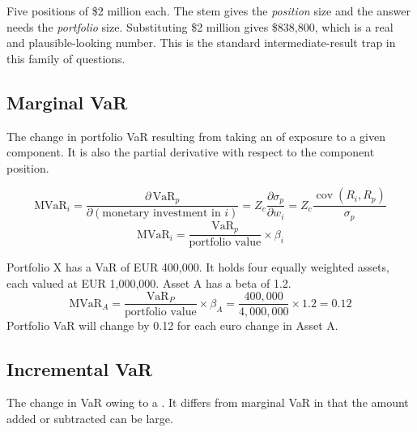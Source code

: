 \begin{imtrapbox}[breakable=false,title={The \$10 million is not given}]
Five positions of \$2 million each. The stem gives the \emph{position} size and
the answer needs the \emph{portfolio} size. Substituting \$2 million gives
\$838,800, which is a real and plausible-looking number. This is the standard
intermediate-result trap in this family of questions.
\end{imtrapbox}

\subsection{Marginal VaR}

\begin{imdefbox}[title={Marginal VaR}]
The change in portfolio VaR resulting from taking an  of
exposure to a given component. It is also the partial derivative with respect to
the component position.
\end{imdefbox}

\begin{imfmlbox}
\[ \text{MVaR}_i = \frac{\partial\,\text{VaR}_p}{\partial(\text{monetary investment in } i)}
  = Z_c\frac{\partial \sigma_p}{\partial w_i}
  = Z_c\frac{\operatorname{cov}(R_i,R_p)}{\sigma_p} \]
\vspace{-10pt}
\[ \text{MVaR}_i = \frac{\text{VaR}_p}{\text{portfolio value}} \times \beta_i \]
\end{imfmlbox}

\begin{imexbox}[title={Marginal VaR from a beta}]
Portfolio X has a VaR of EUR 400,000. It holds four equally weighted assets, each
valued at EUR 1,000,000. Asset A has a beta of 1.2.
\[ \text{MVaR}_A = \frac{\text{VaR}_P}{\text{portfolio value}} \times \beta_A
  = \frac{400{,}000}{4{,}000{,}000} \times 1.2 = \mathbf{0.12} \]
Portfolio VaR will change by 0.12 for each euro change in Asset A.
\end{imexbox}

\subsection{Incremental VaR}

\begin{imdefbox}[title={Incremental VaR}]
The change in VaR owing to a . It differs from marginal VaR in
that the amount added or subtracted can be large.
\end{imdefbox}

